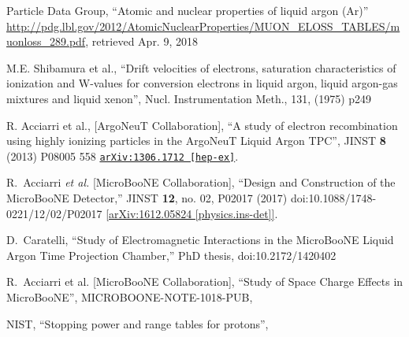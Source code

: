\documentclass[a4paper]{article}
\begin{document}
\begin{thebibliography}{99}
 Particle Data Group, ``Atomic and nuclear properties of liquid argon (Ar)'' \url{http://pdg.lbl.gov/2012/AtomicNuclearProperties/MUON_ELOSS_TABLES/muonloss_289.pdf}, retrieved Apr. 9, 2018

 M.E. Shibamura et al., ``Drift velocities of electrons, saturation characteristics of ionization and W-values for conversion electrons in liquid argon, liquid argon-gas mixtures and liquid xenon'', Nucl. Instrumentation Meth., 131, (1975) p249

 R. Acciarri et al., [ArgoNeuT Collaboration], ``A study of electron recombination using highly ionizing particles in the ArgoNeuT Liquid Argon TPC'', JINST {\bf 8} (2013) P08005
558 \href{https://arxiv.org/abs/1306.1712}{\texttt{arXiv:1306.1712 [hep-ex]}}.

  R.~Acciarri {\it et al.} [MicroBooNE Collaboration],
  ``Design and Construction of the MicroBooNE Detector,''
  JINST {\bf 12}, no. 02, P02017 (2017)
  doi:10.1088/1748-0221/12/02/P02017
  \href{https://arxiv.org/abs/1612.05824}{[arXiv:1612.05824 [physics.ins-det]]}.

  D.~Caratelli,
  ``Study of Electromagnetic Interactions in the MicroBooNE Liquid Argon Time Projection Chamber,'' PhD thesis,
  doi:10.2172/1420402
  
 R.~Acciarri et al. [MicroBooNE Collaboration], ``Study of Space Charge Effects in MicroBooNE'', MICROBOONE-NOTE-1018-PUB, \href{https://www-microboone.fnal.gov/publications/publicnotes/MICROBOONE-NOTE-1018-PUB.pdf}{}

 NIST, ``Stopping power and range tables for protons'', \href{https://physics.nist.gov/PhysRefData/Star/Text/PSTAR.html}{}

\end{thebibliography}



% 
% 
\end{document}
